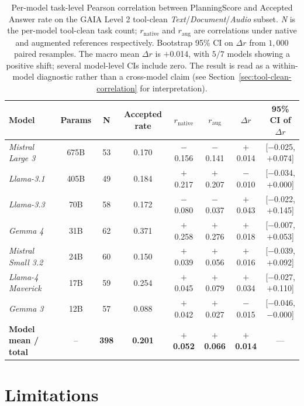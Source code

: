 \documentclass{article}
\providecommand{\model}[1]{\emph{#1}}
\begin{document}
\begin{table}[t]
\centering
\scriptsize
\setlength{\tabcolsep}{9pt}
\begin{tabular}{lccccccc}
\toprule
Model & Params & N & Accepted rate & $r_{\mathrm{native}}$ & $r_{\mathrm{aug}}$ & $\Delta r$ & 95\% CI of $\Delta r$ \\
\midrule
\model{Mistral Large 3} & 675B & 53 & 0.170 & $-$0.156 & $-$0.141 & $+$0.014 & [$-$0.025, $+$0.074] \\
\model{Llama-3.1} & 405B & 49 & 0.184 & $+$0.217 & $+$0.207 & $-$0.010 & [$-$0.034, $+$0.000] \\
\model{Llama-3.3} & 70B & 58 & 0.172 & $-$0.080 & $-$0.037 & $+$0.043 & [$-$0.022, $+$0.145] \\
\model{Gemma 4} & 31B & 62 & 0.371 & $+$0.258 & $+$0.276 & $+$0.018 & [$-$0.007, $+$0.053] \\
\model{Mistral Small 3.2} & 24B & 60 & 0.150 & $+$0.039 & $+$0.056 & $+$0.016 & [$-$0.039, $+$0.092] \\
\model{Llama-4 Maverick} & 17B & 59 & 0.254 & $+$0.045 & $+$0.079 & $+$0.034 & [$-$0.027, $+$0.110] \\
\model{Gemma 3} & 12B & 57 & 0.088 & $+$0.042 & $+$0.027 & $-$0.015 & [$-$0.046, $-$0.000] \\
\midrule
\textbf{Model mean / total} & -- & \textbf{398} & \textbf{0.201} & \textbf{$+$0.052} & \textbf{$+$0.066} & \textbf{$+$0.014} & --- \\
\bottomrule
\end{tabular}
\vspace{0.05cm}
\caption{Per-model task-level Pearson correlation between PlanningScore and Accepted Answer rate on the GAIA Level 2 tool-clean \emph{Text}/\emph{Document}/\emph{Audio} subset. \emph{N} is the per-model tool-clean task count; $r_{\mathrm{native}}$ and $r_{\mathrm{aug}}$ are correlations under native and augmented references respectively. Bootstrap 95\% CI on $\Delta r$ from $1{,}000$ paired resamples. The macro mean $\Delta r$ is $+$0.014, with $5/7$ models showing a positive shift; several model-level CIs include zero. The result is read as a within-model diagnostic rather than a cross-model claim (see Section~\ref{sec:tool-clean-correlation} for interpretation).}
\label{tab:tool-clean-planning-association}
\end{table}


\section{Limitations}
\label{sec:limitations}
\end{document}
